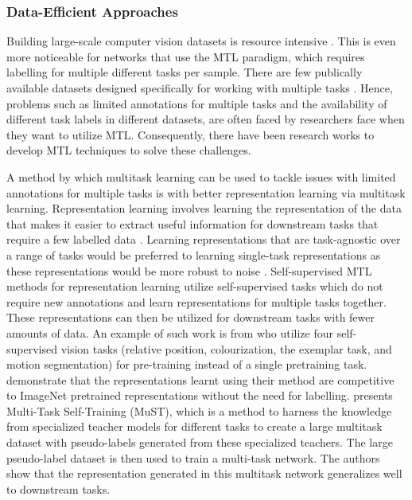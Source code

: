 \subsubsection{Data-Efficient Approaches}
Building large-scale computer vision datasets is resource intensive \citep{Liao_2021_CVPR}. This is even more noticeable for networks that use the MTL paradigm, which requires labelling for multiple different tasks per sample. There are few publically available datasets designed specifically for working with multiple tasks \citep{zamir2018taskonomy,yu2020meta}.
Hence, problems such as limited annotations for multiple tasks and the availability of different task labels in different datasets, are often faced by researchers face when they want to utilize MTL. Consequently, there have been research works to develop MTL techniques to solve these challenges.   

A method by which multitask learning can be used to tackle issues with limited annotations for multiple tasks is with better representation learning via multitask learning. Representation learning involves learning the representation of the data that makes it easier to extract useful information for downstream tasks that require a few labelled data \citep{bengio2013representation}. Learning representations that are task-agnostic over a range of tasks would be preferred to learning single-task representations as these representations would be more robust to noise \citep{nguyen2022task}. Self-supervised MTL methods for representation learning utilize self-supervised tasks which do not require new annotations and learn representations for multiple tasks together.
These representations can then be utilized for downstream tasks with fewer amounts of data. 
An example of such work is from \citet{doersch2017multi} who utilize four self-supervised vision tasks (relative position, colourization, the exemplar task, and motion segmentation) for pre-training instead of a single pretraining task.
\citet{doersch2017multi} demonstrate that the representations learnt using their method are competitive to ImageNet pretrained representations without the need for labelling. \citet{Ghiasi_2021_ICCV} presents Multi-Task Self-Training (MuST), which is a method to harness the knowledge from specialized teacher models for different tasks to create a large multitask dataset with pseudo-labels generated from these specialized teachers. The large pseudo-label dataset is then used to train a multi-task network. The authors show that the representation generated in this multitask network generalizes well to downstream tasks. 

